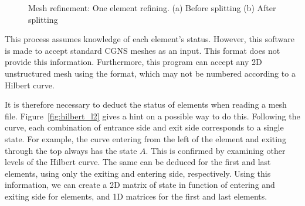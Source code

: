 \begin{figure}[H]
	\centering
	\hfill
	\caption{Mesh refinement: One element refining. (a) Before splitting (b) After splitting}
	\label{fig:hilbert_refining}
\end{figure}

This process assumes knowledge of each element's status. However, this software is made to accept
standard CGNS meshes as an input. This format does not provide this information. Furthermore, this
program can accept any 2D unstructured mesh using the format, which may not be numbered according to
a Hilbert curve. 

It is therefore necessary to deduct the status of elements when reading a mesh file.
Figure~\ref{fig:hilbert_l2} gives a hint on a possible way to do this. Following the curve, each
combination of entrance side and exit side corresponds to a single state. For example, the curve
entering from the left of the element and exiting through the top always has the state $A$. This is
confirmed by examining other levels of the Hilbert curve. The same can be deduced for the first and
last elements, using only the exiting and entering side, respectively. Using this information, we
can create a 2D matrix of state in function of entering and exiting side for elements, and 1D
matrices for the first and last elements.

